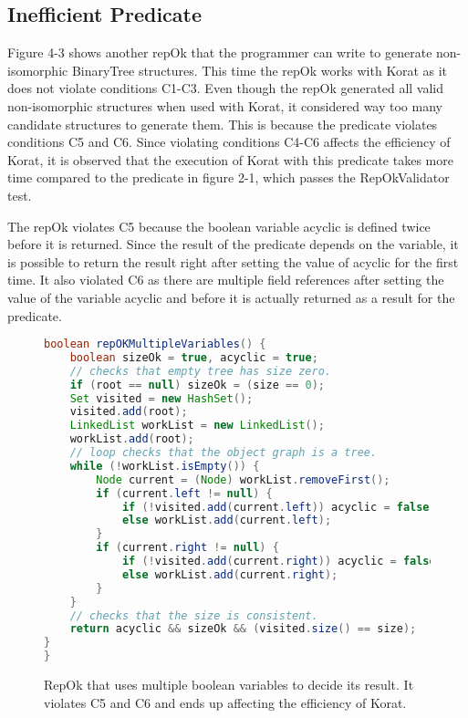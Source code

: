 \subsection{Inefficient Predicate}
Figure 4-3 shows another repOk that the programmer can write to generate non-isomorphic BinaryTree structures. This time the repOk works with Korat as it does not violate conditions C1-C3. Even though the repOk generated all valid non-isomorphic structures when used with Korat, it considered way too many candidate structures to generate them. This is because the predicate violates conditions C5 and C6. Since violating conditions C4-C6 affects the efficiency of Korat, it is observed that the execution of Korat with this predicate takes more time compared to the predicate in figure 2-1, which passes the RepOkValidator test.

\par
The repOk violates C5 because the boolean variable acyclic is defined twice before it is returned. Since the result of the predicate depends on the variable, it is possible to return the result right after setting the value of acyclic for the first time. It also violated C6 as there are multiple field references after setting the value of the variable acyclic and before it is actually returned as a result for the predicate.

\begin{figure}
\centering
\begin{lstlisting}[language=Java]
boolean repOKMultipleVariables() {
    boolean sizeOk = true, acyclic = true;
    // checks that empty tree has size zero.
    if (root == null) sizeOk = (size == 0);
    Set visited = new HashSet();
    visited.add(root);
    LinkedList workList = new LinkedList();
    workList.add(root);
    // loop checks that the object graph is a tree.
    while (!workList.isEmpty()) {
        Node current = (Node) workList.removeFirst();
        if (current.left != null) {
            if (!visited.add(current.left)) acyclic = false;
            else workList.add(current.left);
        }
        if (current.right != null) {
            if (!visited.add(current.right)) acyclic = false;
            else workList.add(current.right);
        }
    }
    // checks that the size is consistent.
    return acyclic && sizeOk && (visited.size() == size);  
}
}
\end{lstlisting}
\caption{RepOk that uses multiple boolean variables to decide its result. It violates C5 and C6 and ends up affecting the efficiency of Korat.}
\label{fig:repOkMultipleBooleanVariables}
\end{figure}

